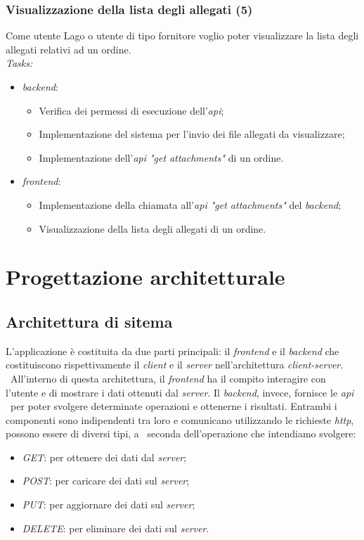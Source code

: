 \subsubsection{Visualizzazione della lista degli allegati (5)}
Come utente Lago o utente di tipo fornitore voglio poter visualizzare la lista degli allegati relativi ad un ordine. \\
\emph{Tasks:}
\begin{itemize}
  \item \emph{\gls{backend}}:
    \begin{itemize}
      \item Verifica dei permessi di esecuzione dell'\emph{\acrshort{api}};
      \item Implementazione del sistema per l'invio dei file allegati da visualizzare;
      \item Implementazione dell'\emph{\acrshort{api} "get attachments"} di un ordine.
    \end{itemize}
  \item \emph{\gls{frontend}}:
    \begin{itemize}
      \item Implementazione della chiamata all'\emph{\acrshort{api} "get attachments"} del \emph{\gls{backend}};
      \item Visualizzazione della lista degli allegati di un ordine.
    \end{itemize}
\end{itemize}

\section{Progettazione architetturale}

\subsection{Architettura di sitema}
L'applicazione è costituita da due parti principali: il \emph{\gls{frontend}} e il \emph{\gls{backend}} che costituiscono rispettivamente il \emph{client} e il \emph{server} nell'architettura \emph{client-server}. \
All'interno di questa architettura, il \emph{\gls{frontend}} ha il compito interagire con l'utente e di mostrare i dati ottenuti dal \emph{server}. Il \emph{\gls{backend}}, invece, fornisce le \emph{\acrshort{api}} \
per poter svolgere determinate operazioni e ottenerne i risultati. Entrambi i componenti sono indipendenti tra loro e comunicano utilizzando le richieste \emph{\acrshort{http}}, possono essere di diversi tipi, a \
seconda dell'operazione che intendiamo svolgere: 
\begin{itemize}
  \item \emph{GET}: per ottenere dei dati dal \emph{server};
  \item \emph{POST}: per caricare dei dati sul \emph{server};
  \item \emph{PUT}: per aggiornare dei dati sul \emph{server};
  \item \emph{DELETE}: per eliminare dei dati sul \emph{server}.
\end{itemize} 

